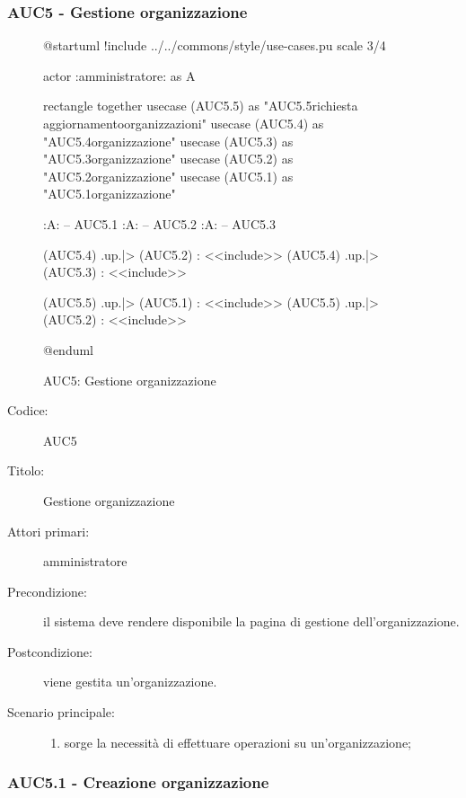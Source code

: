 \documentclass[../analisi-dei-requisiti.tex]{subfiles}
\begin{document}
\subsubsection{AUC5 - Gestione organizzazione}%
\label{subsub:AUC5}

\begin{figure}[h!]
  \centering
  \begin{plantuml}
  @startuml
  !include ../../commons/style/use-cases.pu
  scale 3/4

  actor :amministratore: as A

  rectangle {
    together {
      usecase (AUC5.5) as "AUC5.5\nInvio richiesta aggiornamento\nlista organizzazioni"
      usecase (AUC5.4) as "AUC5.4\nSeleziona organizzazione"
      usecase (AUC5.3) as "AUC5.3\nModifica organizzazione"
      usecase (AUC5.2) as "AUC5.2\nEliminazione organizzazione"
      usecase (AUC5.1) as "AUC5.1\nCreazione organizzazione"
    }
  }

  :A: -- AUC5.1
  :A: -- AUC5.2
  :A: -- AUC5.3

  (AUC5.4) .up.|> (AUC5.2) : <<include>>
  (AUC5.4) .up.|> (AUC5.3) : <<include>>

  (AUC5.5) .up.|> (AUC5.1) : <<include>>
  (AUC5.5) .up.|> (AUC5.2) : <<include>>

  @enduml
  \end{plantuml}
  \caption{AUC5: Gestione organizzazione}
  \label{fig:AUC5}
\end{figure}

\begin{description}
  \item[Codice:] AUC5
  \item[Titolo:] Gestione organizzazione
  \item[Attori primari:] amministratore
  \item[Precondizione:] il sistema deve rendere disponibile la pagina di gestione dell'organizzazione.
  \item[Postcondizione:] viene gestita un'organizzazione.
  \item[Scenario principale:]
  \begin{enumerate}
    \item sorge la necessità di effettuare operazioni su un'organizzazione;
  \end{enumerate}
\end{description}

  \subsubsection{AUC5.1 - Creazione organizzazione}%
  \label{subsub:AUC5.1}
\end{document}

